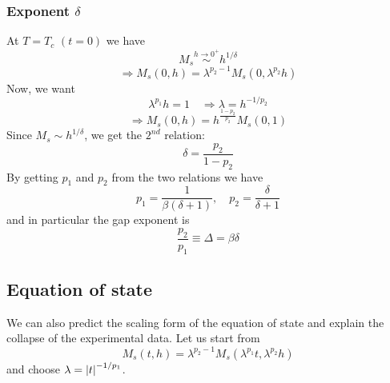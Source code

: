 \documentclass[../main/main.tex]{subfiles}
\begin{document}
\subsubsection{Exponent \( \delta  \)}
At \( T=T_c \) \( (t=0) \) we have
\begin{equation}
   M_s  \overset{h \rightarrow 0^+}{\sim} h^{1/\delta }
\end{equation}
\begin{equation}
  \Rightarrow M_s (0,h) = \lambda ^{p_2 - 1} M_s (0,\lambda ^{p_2} h)
\end{equation}
Now, we want
\begin{equation}
  \lambda ^{p_1} h = 1 \quad \Rightarrow \lambda = h ^{-1/p_2}
\end{equation}
\begin{equation}
  \Rightarrow M_s (0,h) = h ^{\frac{1-p_2}{p_2}} M_s (0,1)
\end{equation}
Since \( M_s \sim h^{1/\delta } \), we get the \( 2^{nd} \) relation:
\begin{equation}
  \delta = \frac{p_2}{ 1 - p_2 }
\end{equation}
By getting \( p_1 \) and \( p_2 \) from the two relations we have
\begin{equation}
  p_1 = \frac{1}{\beta (\delta +1)}, \quad p_2 = \frac{\delta }{\delta + 1}
\end{equation}
and in particular the gap exponent is
\begin{equation}
  \frac{p_2}{p_1} \equiv  \Delta = \beta \delta
\end{equation}

\subsection{Equation of state}
We can also predict the scaling form of the equation of state and explain the collapse of the experimental data. Let us start from
\begin{equation}
  M_s (t,h) = \lambda ^{p_2 - 1} M_s (\lambda ^{p_1} t, \lambda ^{p_2} h)
\end{equation}
and choose \( \lambda = \abs{t}^{-1/p_1}  \).
\end{document}
